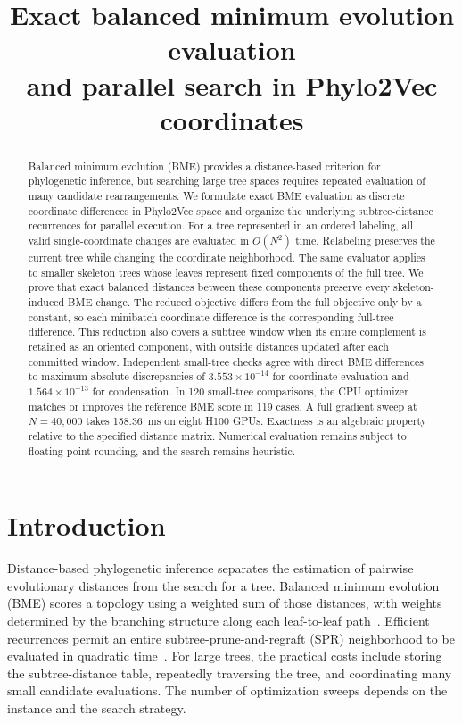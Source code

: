 \documentclass[11pt,a4paper]{article}
\title{Exact balanced minimum evolution evaluation\\and parallel search in Phylo2Vec coordinates}
\author{}
\date{}
\makeatletter
\DeclareRobustCommand{\_}{\ifmmode\nfss@text{\textunderscore}\else\textunderscore\allowbreak\fi}
\theoremstyle{definition}
\makeatother
\begin{document}
\maketitle

\begin{abstract}
Balanced minimum evolution (BME) provides a distance-based criterion for phylogenetic inference, but searching large tree spaces requires repeated evaluation of many candidate rearrangements.
We formulate exact BME evaluation as discrete coordinate differences in Phylo2Vec space and organize the underlying subtree-distance recurrences for parallel execution.
For a tree represented in an ordered labeling, all valid single-coordinate changes are evaluated in $O(N^2)$ time.
Relabeling preserves the current tree while changing the coordinate neighborhood.
The same evaluator applies to smaller skeleton trees whose leaves represent fixed components of the full tree.
We prove that exact balanced distances between these components preserve every skeleton-induced BME change.
The reduced objective differs from the full objective only by a constant, so each minibatch coordinate difference is the corresponding full-tree difference.
This reduction also covers a subtree window when its entire complement is retained as an oriented component, with outside distances updated after each committed window.
Independent small-tree checks agree with direct BME differences to maximum absolute discrepancies of $3.553\times10^{-14}$ for coordinate evaluation and $1.564\times10^{-13}$ for condensation.
In 120 small-tree comparisons, the CPU optimizer matches or improves the reference BME score in 119 cases.
A full gradient sweep at $N=40{,}000$ takes 158.36~ms on eight H100 GPUs.
Exactness is an algebraic property relative to the specified distance matrix.
Numerical evaluation remains subject to floating-point rounding, and the search remains heuristic.
\end{abstract}

\section{Introduction}
\label{sec:introduction}

Distance-based phylogenetic inference separates the estimation of pairwise evolutionary distances from the search for a tree.
Balanced minimum evolution (BME) scores a topology using a weighted sum of those distances, with weights determined by the branching structure along each leaf-to-leaf path~\cite{pauplin2000direct,desper2002fast,desper2004theory}.
Efficient recurrences permit an entire subtree-prune-and-regraft (SPR) neighborhood to be evaluated in quadratic time~\cite{hordijk2005spr,lefort2015fastme}.
For large trees, the practical costs include storing the subtree-distance table, repeatedly traversing the tree, and coordinating many small candidate evaluations.
The number of optimization sweeps depends on the instance and the search strategy.
\end{document}
